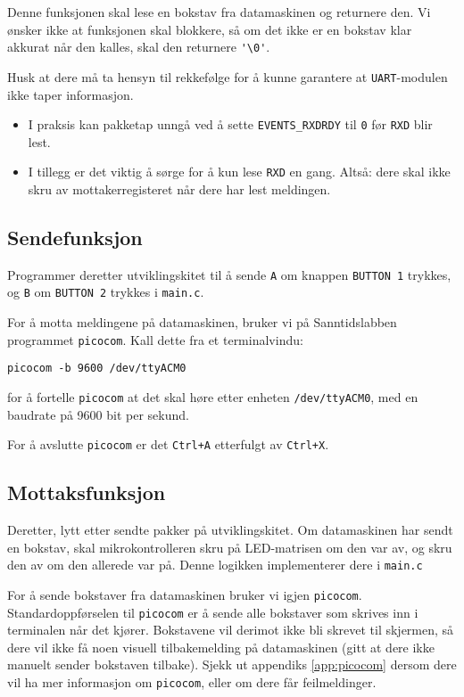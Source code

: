 Denne funksjonen skal lese en bokstav fra datamaskinen og returnere den. Vi ønsker ikke at funksjonen skal blokkere, så om det ikke er en bokstav klar akkurat når den kalles, skal den returnere \verb|'\0'|.

Husk at dere må ta hensyn til rekkefølge for å kunne garantere at \verb|UART|-modulen ikke taper informasjon.

\begin{itemize}
    \item I praksis kan pakketap unngå ved å sette \verb|EVENTS_RXDRDY| til \verb|0| før \verb|RXD| blir lest.
    \item I tillegg er det viktig å sørge for å kun lese \verb|RXD| en gang. Altså: dere skal ikke skru av mottakerregisteret når dere har lest meldingen.
\end{itemize}
\subsection{Sendefunksjon}
Programmer deretter utviklingskitet til å sende \verb|A| om knappen \verb|BUTTON 1| trykkes, og \verb|B| om \verb|BUTTON 2| trykkes i \verb|main.c|.

For å motta meldingene på datamaskinen, bruker vi på Sanntidslabben programmet \verb|picocom|. Kall dette fra et terminalvindu:

\verb|picocom -b 9600 /dev/ttyACM0|

for å fortelle \verb|picocom| at det skal høre etter enheten \verb|/dev/ttyACM0|, med en baudrate på 9600 bit per sekund.

For å avslutte \verb|picocom| er det \verb|Ctrl+A| etterfulgt av \verb|Ctrl+X|.

\subsection{Mottaksfunksjon}
Deretter, lytt etter sendte pakker på utviklingskitet. Om datamaskinen har sendt en bokstav, skal mikrokontrolleren skru på LED-matrisen om den var av, og skru den av om den allerede var på. Denne logikken implementerer dere i \verb|main.c|

For å sende bokstaver fra datamaskinen bruker vi igjen \verb|picocom|. Standardoppførselen til \verb|picocom| er å sende alle bokstaver som skrives inn i terminalen når det kjører. Bokstavene vil derimot ikke bli skrevet til skjermen, så dere vil ikke få noen visuell tilbakemelding på datamaskinen (gitt at dere ikke manuelt sender bokstaven tilbake). Sjekk ut appendiks \ref{app:picocom} dersom dere vil ha mer informasjon om \verb|picocom|, eller om dere får feilmeldinger.


